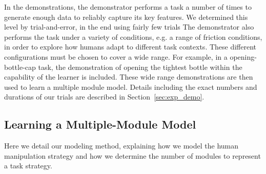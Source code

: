 
In the demonstrations, the demonstrator performs a task a number of
times to generate enough data to reliably capture its key features.
We determined this level by trial-and-error, in the end using fairly
few trials The demonstrator also performs the task under a variety of
conditions, e.g. a range of friction conditions, in order to explore
how humans adapt to different task contexts.   These different
configurations must be chosen to cover a wide range.%
For example, in a opening-bottle-cap task, the demonstration of opening
the tightest bottle within the capability of the learner is
included. These wide range demonstrations are then used to learn a
multiple module model. Details including the exact numbers and
durations of our trials are described in
Section~\ref{sec:exp_demo}. %



\subsection{Learning a Multiple-Module Model}
\label{sec:learn}
Here we detail our modeling method, explaining how we model the human
manipulation strategy and how we determine the number of modules to
represent a task strategy.

